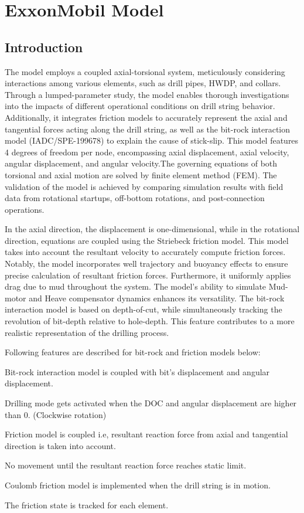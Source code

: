 \chapter{ExxonMobil Model}
\label{ch:exxonmobilmodel}

\section{Introduction}
The model employs a coupled axial-torsional system, meticulously considering interactions among various elements, such as drill pipes, HWDP, and collars. Through a lumped-parameter study, the model enables thorough investigations into the impacts of different operational conditions on drill string behavior. Additionally, it integrates friction models to accurately represent the axial and tangential forces acting along the drill string, as well as the bit-rock interaction model (IADC/SPE-199678) to explain the cause of stick-slip. This model features 4 degrees of freedom per node, encompassing axial displacement, axial velocity, angular displacement, and angular velocity.The governing equations of both torsional and axial motion are solved by finite element method (FEM). The validation of the model is achieved by comparing simulation results with field data from rotational startups, off-bottom rotations, and post-connection operations. 

In the axial direction, the displacement is one-dimensional, while in the rotational direction, equations are coupled using the Striebeck friction model. This model takes into account the resultant velocity to accurately compute friction forces. Notably, the model incorporates well trajectory and buoyancy effects to ensure precise calculation of resultant friction forces. Furthermore, it uniformly applies drag due to mud throughout the system. The model's ability to simulate Mud-motor and Heave compensator dynamics enhances its versatility. The bit-rock interaction model is based on depth-of-cut, while simultaneously tracking the revolution of bit-depth relative to hole-depth. This feature contributes to a more realistic representation of the drilling process.

Following features are described for bit-rock and friction models below:
\begin{bulletedlist}
    \item Bit-rock interaction model is coupled with bit's displacement and angular displacement.
    \item Drilling mode gets activated when the DOC and angular displacement are higher than 0. (Clockwise rotation) 
    \item Friction model is coupled i.e, resultant reaction force from axial and tangential direction is taken into account.
    \item No movement until the resultant reaction force reaches static limit.
    \item Coulomb friction model is implemented when the drill string is in motion.
    \item The friction state is tracked for each element.
\end{bulletedlist}

